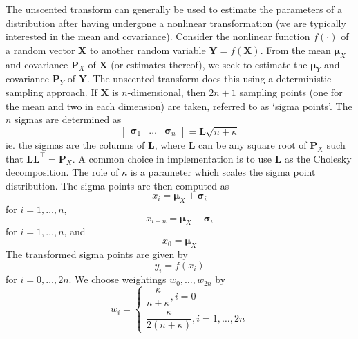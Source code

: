 \documentclass[11pt]{report} %
\begin{document}
The unscented transform can generally be used to estimate the parameters of a distribution after having undergone a nonlinear transformation (we are typically interested in the mean and covariance). Consider the nonlinear function $f\left(\cdot\right)$ of a random vector $\mathbf{X}$ to another random variable $\mathbf{Y} = f\left(\mathbf{X}\right)$. From the mean $\boldsymbol{\mu}_{X}$ and covariance $\mathbf{P}_{X}$ of $\mathbf{X}$ (or estimates thereof), we seek to estimate the $\boldsymbol{\mu}_{Y}$ and covariance $\mathbf{P}_{Y}$ of $\mathbf{Y}$. The unscented transform does this using a deterministic sampling approach. If $\mathbf{X}$ is $n$-dimensional, then $2n + 1$ sampling points (one for the mean and two in each dimension) are taken, referred to as `sigma points'. The $n$ sigmas are determined as
\begin{equation}
\begin{bmatrix}
\boldsymbol{\sigma}_{1} & \dots & \boldsymbol{\sigma}_{n}
\end{bmatrix} = \mathbf{L}\sqrt{n + \kappa}
\end{equation}
ie. the sigmas are the columns of $\mathbf{L}$, where $\mathbf{L}$ can be any square root of $\mathbf{P}_{X}$ such that $\mathbf{L}\mathbf{L}^{\top} = \mathbf{P}_{X}$. A common choice in implementation is to use $\mathbf{L}$ as the Cholesky decomposition. The role of $\kappa$ is a parameter which scales the sigma point distribution. The sigma points are then computed as
\begin{equation}
x_{i} = \boldsymbol{\mu}_{X} + \boldsymbol{\sigma}_{i}
\end{equation}
for $i = 1, \dots, n$,
\begin{equation}
x_{i + n} = \boldsymbol{\mu}_{X} - \boldsymbol{\sigma}_{i}
\end{equation}
for $i = 1, \dots, n$, and
\begin{equation}
x_{0} = \boldsymbol{\mu}_{X}
\end{equation}
The transformed sigma points are given by
\begin{equation}
y_{i} = f\left(x_{i}\right)
\end{equation}
for $i = 0, \dots, 2n$. We choose weightings $w_{0}, \dots, w_{2n}$ by
\begin{equation}
w_{i} = \begin{cases} \dfrac{\kappa}{n + \kappa}, i = 0 \\ \dfrac{\kappa}{2\left(n + \kappa\right)}, i = 1, \dots, 2n \end{cases}
\end{equation}
\end{document}
